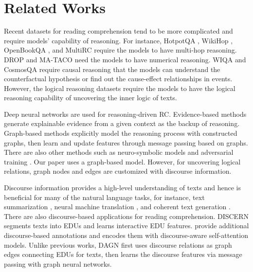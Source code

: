 \documentclass[11pt]{article}
\begin{document}
\section{Related Works}
\vspace{-1mm}
Recent datasets for reading comprehension tend to be more complicated and require models' capability of reasoning. For instance, HotpotQA \cite{yang2018hotpotqa}, WikiHop \cite{welbl2018constructing}, OpenBookQA \cite{mihaylov2018can}, and MultiRC \cite{khashabi2018looking} require the models to have multi-hop reasoning.
DROP \cite{dua2019drop} and MA-TACO \cite{zhou-etal-2019-going} need the models to have numerical reasoning.
WIQA \cite{tandon2019wiqa} and CosmosQA \cite{huang2019cosmos} require causal reasoning that the 
models can understand the counterfactual hypothesis or find out the cause-effect relationships in events. 
However, the logical reasoning datasets \cite{yu2020reclor, liu2020logiqa} require the models to have the logical reasoning capability of uncovering the inner logic of texts. 



Deep neural networks are used for reasoning-driven RC.
Evidence-based methods \cite{madaan2020eigen, huang2020rem, rajagopal2020if} generate explainable evidence from a given context as the backup of reasoning. Graph-based methods \cite{qiu-etal-2019-dynamically,de2019question,cao2019bag, ran2019numnet, chen-etal-2020-question,yunqiu2020deep, zhang2020graph} explicitly model the reasoning process with constructed graphs, then learn and update features through message passing based on graphs. There are also other methods such as neuro-symbolic models \cite{saha2021weakly} and adversarial training \cite{pereira-etal-2020-adversarial}. 
Our paper uses a graph-based model. However, for uncovering logical relations, graph nodes and edges are customized with discourse information. 

Discourse information provides a high-level understanding of texts and hence is beneficial for many of the natural language tasks, for instance, text summarization \cite{cohan-etal-2018-discourse, joty-etal-2019-discourse, xu-etal-2020-discourse, feng2020dialogue}, neural machine translation \cite{voita2018context}, and coherent text generation \cite{wang2020consistency, bosselut2018discourse}. 
There are also discourse-based applications for reading comprehension. DISCERN \cite{gao2020discern} segments texts into EDUs and learns interactive EDU features.
\citet{mihaylov-frank-2019-discourse} provide additional discourse-based annotations and encodes them with discourse-aware self-attention models. 
Unlike previous works, DAGN first uses discourse relations as graph edges connecting EDUs for texts, then learns the discourse features via message passing with graph neural networks. 
\end{document}

